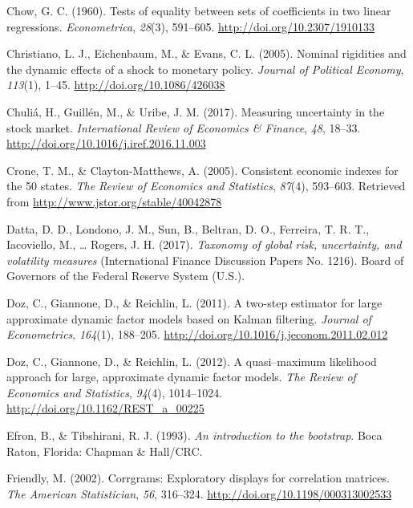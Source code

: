 \documentclass[12pt,twoside]{reedthesis}
\begin{document}
\leavevmode\hypertarget{ref-chow:1960}{}%
Chow, G. C. (1960). Tests of equality between sets of coefficients in two linear regressions. \emph{Econometrica}, \emph{28}(3), 591--605. \url{http://doi.org/10.2307/1910133}

\leavevmode\hypertarget{ref-chrieichevan:2005}{}%
Christiano, L. J., Eichenbaum, M., \& Evans, C. L. (2005). Nominal rigidities and the dynamic effects of a shock to monetary policy. \emph{Journal of Political Economy}, \emph{113}(1), 1--45. \url{http://doi.org/10.1086/426038}

\leavevmode\hypertarget{ref-chulguilurib:2017}{}%
Chuliá, H., Guillén, M., \& Uribe, J. M. (2017). Measuring uncertainty in the stock market. \emph{International Review of Economics \& Finance}, \emph{48}, 18--33. \url{http://doi.org/10.1016/j.iref.2016.11.003}

\leavevmode\hypertarget{ref-cronclay:2005}{}%
Crone, T. M., \& Clayton-Matthews, A. (2005). Consistent economic indexes for the 50 states. \emph{The Review of Economics and Statistics}, \emph{87}(4), 593--603. Retrieved from \url{http://www.jstor.org/stable/40042878}

\leavevmode\hypertarget{ref-dattlondsunbeltferriacojahaligiudroge:2017}{}%
Datta, D. D., Londono, J. M., Sun, B., Beltran, D. O., Ferreira, T. R. T., Iacoviello, M., \ldots{} Rogers, J. H. (2017). \emph{Taxonomy of global risk, uncertainty, and volatility measures} (International Finance Discussion Papers No. 1216). Board of Governors of the Federal Reserve System (U.S.).

\leavevmode\hypertarget{ref-dozgianreic:2011}{}%
Doz, C., Giannone, D., \& Reichlin, L. (2011). A two-step estimator for large approximate dynamic factor models based on Kalman filtering. \emph{Journal of Econometrics}, \emph{164}(1), 188--205. \url{http://doi.org/10.1016/j.jeconom.2011.02.012}

\leavevmode\hypertarget{ref-dozgianreic:2012}{}%
Doz, C., Giannone, D., \& Reichlin, L. (2012). A quasi--maximum likelihood approach for large, approximate dynamic factor models. \emph{The Review of Economics and Statistics}, \emph{94}(4), 1014--1024. \url{http://doi.org/10.1162/REST_a_00225}

\leavevmode\hypertarget{ref-efrotibs:1993}{}%
Efron, B., \& Tibshirani, R. J. (1993). \emph{An introduction to the bootstrap}. Boca Raton, Florida: Chapman \& Hall/CRC.

\leavevmode\hypertarget{ref-friendly:2002}{}%
Friendly, M. (2002). Corrgrams: Exploratory displays for correlation matrices. \emph{The American Statistician}, \emph{56}, 316--324. \url{http://doi.org/10.1198/000313002533}
\end{document}
